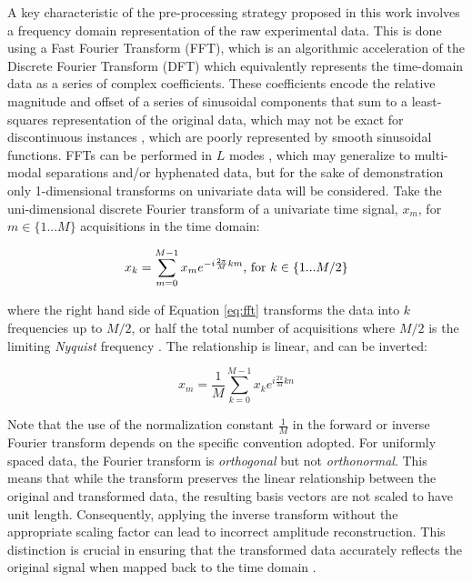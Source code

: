\documentclass[preprint,12pt]{elsarticle}
\begin{document}
A key characteristic of the pre-processing strategy proposed in this work involves a frequency domain representation of the raw experimental data. This is done using a Fast Fourier Transform (FFT), which is an algorithmic acceleration of the Discrete Fourier Transform (DFT) which equivalently represents the time-domain data as a series of complex coefficients. These coefficients encode the relative magnitude and offset of a series of sinusoidal components that sum to a least-squares representation of the original data, which may not be exact for discontinuous instances \cite{nussbaumer1974gibbs}, which are poorly represented by smooth sinusoidal functions. FFTs can be performed in $L$ modes \cite{smith1995handbook}, which may generalize to multi-modal separations and/or hyphenated data, but for the sake of demonstration only 1-dimensional transforms on univariate data will be considered. Take the uni-dimensional discrete Fourier transform of a univariate time signal, $x_m$, for $m \in \{1...M\}$ acquisitions in the time domain:

\begin{equation}\label{eq:fft}
    x_k = \sum_{m=0}^{M-1} x_m e^{-i \frac{2\pi}{M} km}\textnormal{, for } k \in \{1...M/2\}
\end{equation}

\noindent where the right hand side of Equation \ref{eq:fft} transforms the data into $k$ frequencies up to $M/2$, or half the total number of acquisitions where $M/2$ is the limiting \textit{Nyquist} frequency \cite{smith1995handbook}. The relationship is linear, and can be inverted:

\begin{equation}\label{eq:ifft}
    x_m = \frac{1}{M} \sum_{k=0}^{M-1} x_k e^{i \frac{2\pi}{M} kn}
\end{equation}

Note that the use of the normalization constant $\frac{1}{M}$ in the forward or inverse Fourier transform depends on the specific convention adopted. For uniformly spaced data, the Fourier transform is \textit{orthogonal} but not \textit{orthonormal}. This means that while the transform preserves the linear relationship between the original and transformed data, the resulting basis vectors are not scaled to have unit length. Consequently, applying the inverse transform without the appropriate scaling factor can lead to incorrect amplitude reconstruction. This distinction is crucial in ensuring that the transformed data accurately reflects the original signal when mapped back to the time domain \cite{armstrong2023direct}.
\end{document}
